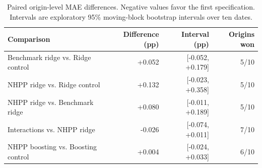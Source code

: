 \begin{table}[H]
\centering
\small
\caption{Paired origin-level MAE differences. Negative values favor the first specification. Intervals are exploratory 95\% moving-block bootstrap intervals over ten dates.}\label{tab:release-pairs}
\begin{tabular}{lrrr}
\toprule
Comparison & Difference (pp) & Interval (pp) & Origins won \\
\midrule
Benchmark ridge vs. Ridge control & +0.052 & [-0.052, +0.179] & 5/10 \\
NHPP ridge vs. Ridge control & +0.132 & [-0.023, +0.358] & 5/10 \\
NHPP ridge vs. Benchmark ridge & +0.080 & [-0.011, +0.189] & 5/10 \\
Interactions vs. NHPP ridge & -0.026 & [-0.074, +0.011] & 7/10 \\
NHPP boosting vs. Boosting control & +0.004 & [-0.024, +0.033] & 6/10 \\
\bottomrule
\end{tabular}
\end{table}
